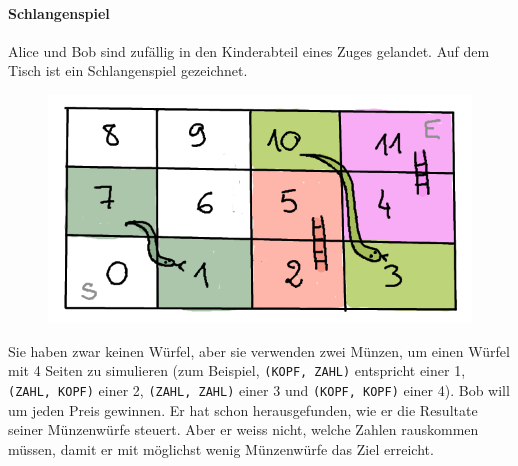 \paragraph{Schlangenspiel}
Alice und Bob sind zufällig in den Kinderabteil eines Zuges gelandet. Auf dem Tisch ist ein Schlangenspiel gezeichnet.
\begin{figure}[H]
    \centering
    \includegraphics[width=\textwidth]{Pictures/SP/schlangen_spiel.png}
\end{figure}
Sie haben zwar keinen Würfel, aber sie verwenden zwei Münzen, um einen Würfel mit 4 Seiten zu simulieren (zum Beispiel, \texttt{(KOPF, ZAHL)} entspricht einer 1, \texttt{(ZAHL, KOPF)} einer 2, \texttt{(ZAHL, ZAHL)} einer 3 und \texttt{(KOPF, KOPF)} einer 4).
Bob will um jeden Preis gewinnen. Er hat schon herausgefunden, wie er die Resultate seiner Münzenwürfe steuert. Aber er weiss nicht, welche Zahlen rauskommen müssen, damit er mit möglichst wenig Münzenwürfe das Ziel erreicht.


